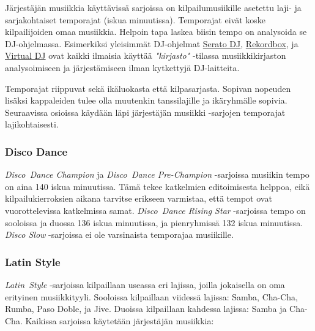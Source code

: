\documentclass[12pt, a4paper, oneside]{article}
\begin{document}
Järjestäjän musiikkia käyttävissä sarjoissa on kilpailumusiikille asetettu laji- ja sarjakohtaiset temporajat (iskua minuutissa).
Temporajat eivät koske kilpailijoiden omaa musiikkia.
Helpoin tapa laskea biisin tempo on analysoida se DJ-ohjelmassa.
Esimerkiksi yleisimmät DJ-ohjelmat \href{https://serato.com/dj}{Serato DJ},
\href{https://rekordbox.com/}{Rekordbox},
ja \href{https://www.virtualdj.com/}{Virtual DJ}
ovat kaikki ilmaisia käyttää \textit{"kirjasto"} -tilassa musiikkikirjaston analysoimiseen ja järjestämiseen ilman kytkettyjä DJ-laitteita.

Temporajat riippuvat sekä ikäluokasta että kilpasarjasta.
Sopivan nopeuden lisäksi kappaleiden tulee olla muutenkin tanssilajille ja ikäryhmälle sopivia.
Seuraavissa osioissa käydään läpi järjestäjän musiikki -sarjojen temporajat lajikohtaisesti.

\subsubsection{Disco Dance}

\textit{Disco~Dance Champion} ja \textit{Disco~Dance Pre-Champion} -sarjoissa musiikin tempo on aina 140 iskua minuutissa.
Tämä tekee katkelmien editoimisesta helppoa,
eikä kilpailukierroksien aikana tarvitse erikseen varmistaa,
että tempot ovat vuorottelevissa katkelmissa samat.
\textit{Disco~Dance Rising Star} -sarjoissa tempo on sooloissa ja duossa 136 iskua minuutissa,
ja pienryhmissä 132 iskua minuutissa.
\textit{Disco Slow} -sarjoissa ei ole varsinaista temporajaa musiikille.

\subsubsection{Latin Style}

\textit{Latin~Style} -sarjoissa kilpaillaan useassa eri lajissa,
joilla jokaisella on oma erityinen musiikkityyli.
Sooloissa kilpaillaan viidessä lajissa: Samba, Cha-Cha, Rumba, Paso Doble, ja Jive.
Duoissa kilpaillaan kahdessa lajissa: Samba ja Cha-Cha.
Kaikissa sarjoissa käytetään järjestäjän musiikkia: \medskip
\end{document}
